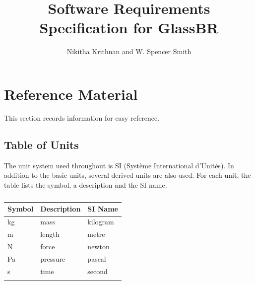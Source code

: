 \documentclass[12pt]{article}
\title{Software Requirements Specification for GlassBR}
\author{Nikitha Krithnan and W. Spencer Smith}
\begin{document}
\maketitle
\tableofcontents
\newpage
\section{Reference Material}
\label{Sec:RefMat}
This section records information for easy reference.
\subsection{Table of Units}
\label{Sec:ToU}
The unit system used throughout is SI (Système International d'Unités). In addition to the basic units, several derived units are also used. For each unit, the table lists the symbol, a description and the SI name.
\begin{longtable}{l l l}
\toprule
Symbol & Description & SI Name
\\
\midrule
\endhead
kg & mass & kilogram
\\
m & length & metre
\\
N & force & newton
\\
Pa & pressure & pascal
\\
s & time & second
\\
\bottomrule
\caption{}
\label{Table:ToU}
\end{longtable}
\end{document}
